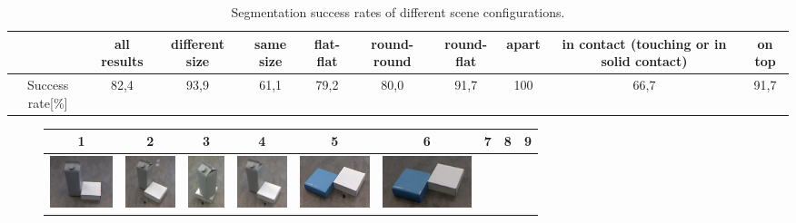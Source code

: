\begin{table}[h!]\scriptsize
\hspace*{-2.1cm} 
\begin{tabular}{|c |c| c| c| c| c| c|c|c|c|}
\hline    &all    results   &    different    size    &   same    size
&flat-flat&round-round&round-flat & apart & in contact (touching or in
solid contact) & on top\\ \hline Success rate[\%] & 82,4 & 93,9 & 61,1
&79,2&80,0&91,7 & 100 & 66,7 & 91,7\\\hline
\end{tabular}
\caption{Segmentation success rates of different scene configurations.
}
\label{tab:result_percentage}
\end{table}

\begin{figure}[h!]  %
  \hspace*{-2.6cm}  
    \begin{tabular}{ccccccccc}
      \hline
      1 & 2 & 3 & 4 & 5 & 6 & 7 & 8 & 9 \\
      \hline
      \hline
    \includegraphics[height=1.5cm]{pictures/11.jpg}&
    \includegraphics[height=1.5cm]{pictures/21.jpg}&
    \includegraphics[height=1.5cm]{pictures/31.jpg}&
    \includegraphics[height=1.5cm]{pictures/41.jpg}&
    \includegraphics[height=1.5cm]{pictures/51.jpg}&
    \includegraphics[height=1.5cm]{pictures/61.jpg}&

\end{tabular}
\end{figure}
